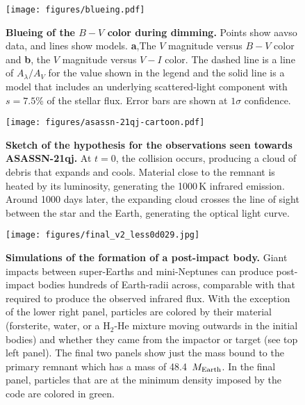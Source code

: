 \documentclass[sn-nature,oneside]{sn-jnl}%
\begin{document}
\begin{figure}
    \centering
\texttt{[image: figures/blueing.pdf]}
    \caption{\textbf{Blueing of the $B-V$ color during dimming.}
    Points show \gls{aavso} data, and lines show models.
    {\bf a},The $V$ magnitude versus $B-V$ color and {\bf b}, the  $V$ magnitude versus $V-I$ color.
    The dashed line is a line of $A_\lambda/A_V$ for the value shown in the legend and the solid line is a model that includes an underlying scattered-light component with $s=7.5$\% of the stellar flux.
    Error bars are shown at $1\sigma$ confidence.
}
    \label{fig:blueing}
\end{figure}

\begin{figure}
    \centering
\texttt{[image: figures/asassn-21qj-cartoon.pdf]}
    \caption{\textbf{Sketch of the hypothesis for the observations seen towards ASASSN-21qj.}
    At $t=0$, the collision occurs, producing a cloud of debris that expands and cools.
    Material close to the remnant is heated by its luminosity, generating the 1000\,K infrared emission.
    Around 1000 days later, the expanding cloud crosses the line of sight between the star and the Earth, generating the optical light curve.}
    \label{fig:hypothesis}
\end{figure}


\begin{figure}
    \centering
\texttt{[image: figures/final\_v2\_less0d029.jpg]}
    \caption{\textbf{Simulations of the formation of a post-impact body.}
    Giant impacts between super-Earths and mini-Neptunes can produce post-impact bodies hundreds of Earth-radii across, comparable with that required to produce the observed infrared flux. With the exception of the lower right panel, particles are colored by their material (forsterite, water, or a H$_2$-He mixture moving outwards in the initial bodies) and whether they came from the impactor or target (see top left panel). The final two panels show just the mass bound to the primary remnant which has a mass of 48.4~$M_{\rm Earth}$. In the final panel, particles that are at the minimum density imposed by the code are colored in green.}
    \label{fig:SPH}
\end{figure}
\end{document}
